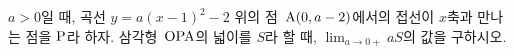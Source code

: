 $a>0$일 때, 곡선 $y=a(x-1)^2-2$ 위의 점~$\mathrm{A}(0{,}\mkern3mu\mathopen{}a-2)$에서의 접선이 $x$축과 만나는 점을 $\mathrm{P}$라 하자. 삼각형~$\mathrm{OPA}$의 넓이를 $S$라 할 때, $\displaystyle\lim_{a\to 0+} aS$의 값을 구하시오. 
